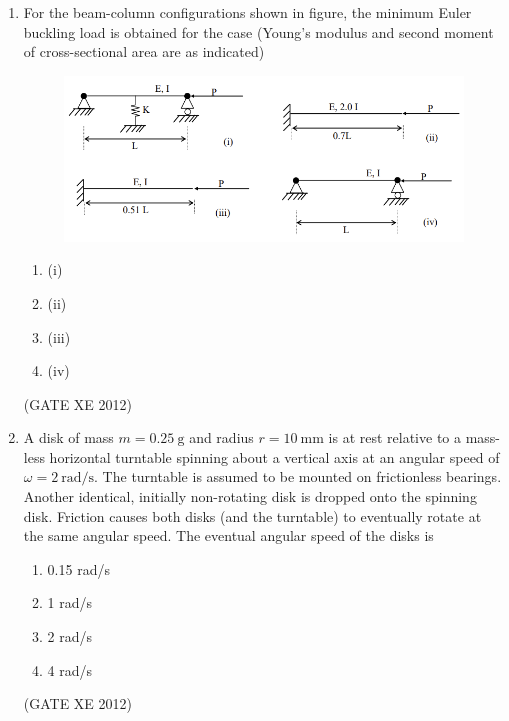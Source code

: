 \documentclass[12pt]{article}
\begin{document}
\begin{enumerate}
\item For the beam-column configurations shown in figure, the minimum Euler buckling load is obtained for the case (Young’s modulus and second moment of cross-sectional area are as indicated)  

\begin{figure}[H]
    \centering
    \includegraphics[width=1\columnwidth]{figs/ass2_d_q4.png}
    \caption{}
    \label{fig:placeholder}
\end{figure}

\begin{multicols}{4}
\begin{enumerate}
    \item (i)
    \item (ii)
    \item (iii)
    \item (iv)
\end{enumerate}
\end{multicols}
(GATE XE 2012)


\item A disk of mass $m=0.25~\text{g}$ and radius $r=10~\text{mm}$ is at rest relative to a mass-less horizontal turntable spinning about a vertical axis at an angular speed of $\omega=2~\text{rad/s}$. The turntable is assumed to be mounted on frictionless bearings. Another identical, initially non-rotating disk is dropped onto the spinning disk. Friction causes both disks (and the turntable) to eventually rotate at the same angular speed. The eventual angular speed of the disks is  

\begin{multicols}{4}
\begin{enumerate}
    \item 0.15 rad/s
    \item 1 rad/s
    \item 2 rad/s
    \item 4 rad/s
\end{enumerate}
\end{multicols}
(GATE XE 2012)



\end{enumerate}
\end{document}
